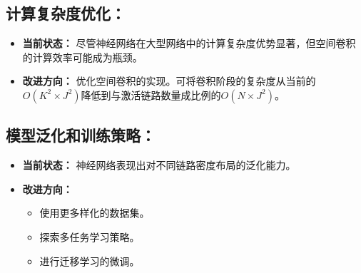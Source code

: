 \documentclass[UTF8, 12pt]{article}
\numberwithin{figure}{section}
\begin{document}
  \subsection{计算复杂度优化：}
  \begin{itemize}
      \item \textbf{当前状态：} 尽管神经网络在大型网络中的计算复杂度优势显著，但空间卷积的计算效率可能成为瓶颈。
      \item \textbf{改进方向：} 优化空间卷积的实现。可将卷积阶段的复杂度从当前的\( O(K^2 \times J^2) \)降低到与激活链路数量成比例的\( O(N \times J^2) \)。
  \end{itemize}
  
  \subsection{模型泛化和训练策略：}
  \begin{itemize}
      \item \textbf{当前状态：} 神经网络表现出对不同链路密度布局的泛化能力。
      \item \textbf{改进方向：} 
          \begin{itemize}
              \item 使用更多样化的数据集。
              \item 探索多任务学习策略。
              \item 进行迁移学习的微调。
          \end{itemize}
  \end{itemize}
  
  



\end{document}
